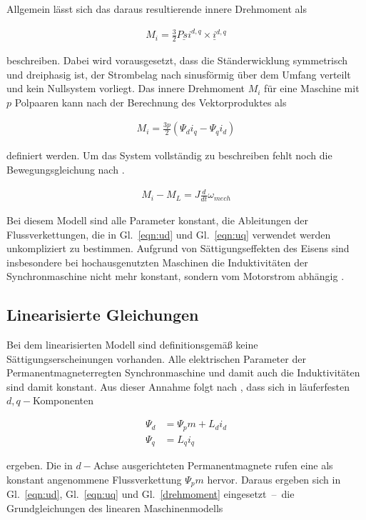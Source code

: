 Allgemein lässt sich das daraus resultierende innere Drehmoment als

\begin{align}
M_i = \frac{3}{2} \underline{Psi}^{d,q} \times \underline{i}^{d,q} \label{drehmoment}
\end{align}

beschreiben.
Dabei wird vorausgesetzt, dass die Ständerwicklung symmetrisch und dreiphasig ist, der Strombelag nach \textcite{ternesfeldkamp} sinusförmig über dem Umfang verteilt und kein Nullsystem vorliegt.
Das innere Drehmoment $M_i$ für eine Maschine mit $p$ Polpaaren kann nach der Berechnung des Vektorproduktes als

\begin{align}
M_i = \frac{3p}{2}(\Psi_d i_q - \Psi_q i_d)
\end{align}

definiert werden.
Um das System vollständig zu beschreiben fehlt noch die Bewegungsgleichung nach \textcite{mullerI2005}.

\begin{align}
M_i - M_L = J \frac{d}{dt} \omega_{mech}
\end{align}

Bei diesem Modell sind alle Parameter konstant, die Ableitungen der Flussverkettungen, die in Gl.~\ref{eqn:ud} und Gl.~\ref{eqn:uq} verwendet werden unkompliziert zu bestimmen.
Aufgrund von Sättigungseffekten des Eisens sind insbesondere bei hochausgenutzten Maschinen die Induktivitäten der Synchronmaschine nicht mehr konstant, sondern vom Motorstrom abhängig \autocite{Kellner2012}.

\subsection{Linearisierte Gleichungen}\label{sec:lin-gleichungen}

Bei dem linearisierten Modell sind definitionsgemäß \autocite{mullerII2008} keine Sättigungserscheinungen vorhanden.
Alle elektrischen Parameter der Permanentmagneterregten Synchronmaschine und damit auch die Induktivitäten sind damit konstant.
Aus dieser Annahme folgt nach \textcite{ternesfeldkamp}, dass sich in läuferfesten $d, q-$Komponenten

\begin{align}
\Psi_d &= \Psi_pm + L_d i_d \\
\Psi_q &= L_q i_q
\end{align}

ergeben.
Die in $d-$Achse ausgerichteten Permanentmagnete rufen eine als konstant angenommene Flussverkettung $\Psi_pm$ hervor.
Daraus ergeben sich in Gl.~\ref{eqn:ud}, Gl.~\ref{eqn:uq} und Gl.~\ref{drehmoment} eingesetzt~--~die Grundgleichungen des linearen Maschinenmodells

